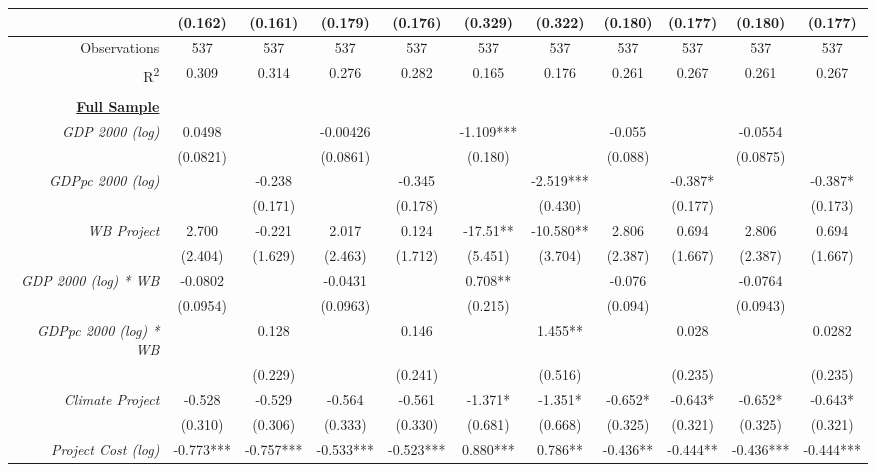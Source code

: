 \documentclass{article}
\begin{document}
\begin{singlespace}
\begin{landscape}
\begin{table}[H]
{\begin{tabular}{rcccccccccc}
					\textit{} & (0.162) & (0.161) & (0.179) & (0.176) & (0.329) & (0.322) & (0.180) & (0.177) & (0.180) & (0.177) \\ \hline
					Observations & 537 & 537 & 537 & 537 & 537 & 537 & 537 & 537 & 537 & 537 \\
					R\textsuperscript{2} & 0.309 & 0.314 & 0.276 & 0.282 & 0.165 & 0.176 & 0.261 & 0.267 & 0.261 & 0.267 \\ \hline
					\multicolumn{1}{l}{\textit{}} & \multicolumn{1}{l}{} & \multicolumn{1}{l}{} & \multicolumn{1}{l}{} & \multicolumn{1}{l}{} & \multicolumn{1}{l}{} & \multicolumn{1}{l}{} & \multicolumn{1}{l}{} & \multicolumn{1}{l}{} & \multicolumn{1}{l}{} & \multicolumn{1}{l}{} \\
					{\ul \textbf{Full Sample}} &  &  &  &  &  &  &  &  &  &  \\
					\textit{GDP 2000 (log)} & 0.0498 &  & -0.00426 &  & -1.109*** &  & -0.055 &  & -0.0554 &  \\
					\textit{} & (0.0821) &  & (0.0861) &  & (0.180) &  & (0.088) &  & (0.0875) &  \\
					\textit{GDPpc 2000 (log)} &  & -0.238 &  & -0.345 &  & -2.519*** &  & -0.387* &  & -0.387* \\
					\textit{} &  & (0.171) &  & (0.178) &  & (0.430) &  & (0.177) &  & (0.173) \\
					\textit{WB Project} & 2.700 & -0.221 & 2.017 & 0.124 & -17.51** & -10.580** & 2.806 & 0.694 & 2.806 & 0.694 \\
					\textit{} & (2.404) & (1.629) & (2.463) & (1.712) & (5.451) & (3.704) & (2.387) & (1.667) & (2.387) & (1.667) \\
					\textit{GDP 2000 (log) * WB} & -0.0802 &  & -0.0431 &  & 0.708** &  & -0.076 &  & -0.0764 &  \\
					\textit{} & (0.0954) &  & (0.0963) &  & (0.215) &  & (0.094) &  & (0.0943) &  \\
					\textit{GDPpc 2000 (log) * WB} &  & 0.128 &  & 0.146 &  & 1.455** &  & 0.028 &  & 0.0282 \\
					\textit{} &  & (0.229) &  & (0.241) &  & (0.516) &  & (0.235) &  & (0.235) \\
					\textit{Climate Project} & -0.528 & -0.529 & -0.564 & -0.561 & -1.371* & -1.351* & -0.652* & -0.643* & -0.652* & -0.643* \\
					\textit{} & (0.310) & (0.306) & (0.333) & (0.330) & (0.681) & (0.668) & (0.325) & (0.321) & (0.325) & (0.321) \\
					\textit{Project Cost (log)} & -0.773*** & -0.757*** & -0.533*** & -0.523*** & 0.880*** & 0.786** & -0.436** & -0.444** & -0.436*** & -0.444*** \\

\end{tabular}}
\end{table}
\end{landscape}
\end{singlespace}
\end{document}
